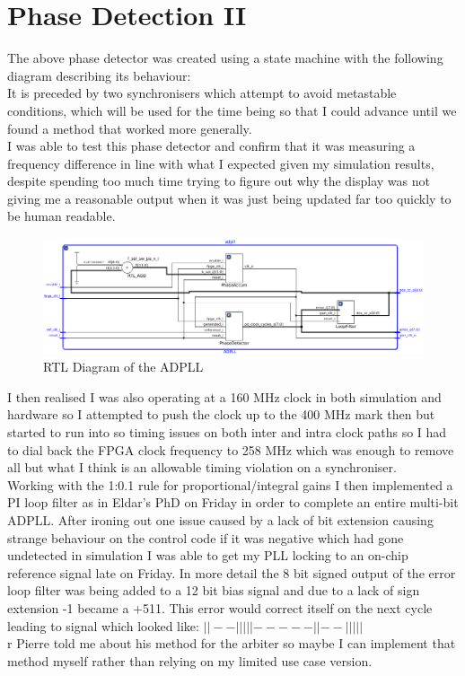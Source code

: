 \documentclass[a4paper,12pt]{report}
\begin{document}
\section*{Phase Detection II}
The above phase detector was created using a state machine with the following diagram describing its behaviour:\\
It is preceded by two synchronisers which attempt to avoid metastable conditions, which will be used for the time being so that I could advance until we found a method that worked more generally.\\
I was able to test this phase detector and confirm that it was measuring a frequency difference in line with what I expected given my simulation results, despite spending too much time trying to figure out why the display was not giving me a reasonable output when it was just being updated far too quickly to be human readable.\\
\begin{figure}[h]
    \centering
    \includegraphics[scale=0.33]{../ADPLL_RTL_VIVADO}
    \caption{RTL Diagram of the ADPLL}
    \label{fig:adpll_rtl}
\end{figure}
I then realised I was also operating at a 160 MHz clock in both simulation and hardware so I attempted to push the clock up to the 400 MHz mark then but started to run into so timing issues on both inter and intra clock paths so I had to dial back the FPGA clock frequency to 258 MHz which was enough to remove all but what I think is an allowable timing violation on a synchroniser.\\
Working with the 1:0.1 rule for proportional/integral gains I then implemented a PI loop filter as in Eldar's PhD on Friday in order to complete an entire multi-bit ADPLL.
After ironing out one issue caused by a lack of bit extension causing strange behaviour on the control code if it was negative which had gone undetected in simulation I was able to get my PLL locking to an on-chip reference signal late on Friday.
In more detail the 8 bit signed output of the error loop filter was being added to a 12 bit bias signal and due to a lack of sign extension -1 became a +511. This error would correct itself on the next cycle leading to signal which looked like: $||--|||||-----||--|||||$\\r
Pierre told me about his method for the arbiter so maybe I can implement that method myself rather than relying on my limited use case version.
\end{document}
